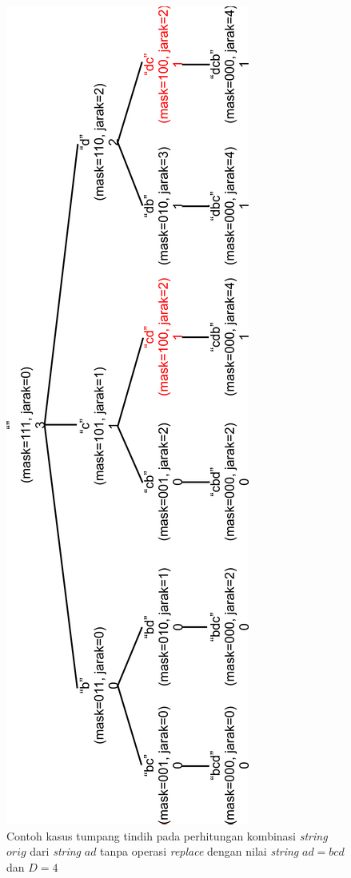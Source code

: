 \begin{figure}
	\centerline{ \includegraphics[scale=0.3]{assets/images/new/jpg/subproblem1-overlapping-rotated.jpg}}
	\caption{Contoh kasus tumpang tindih pada perhitungan kombinasi \textit{string} $ orig $ dari \textit{string} $ ad $ tanpa operasi \textit{replace} dengan nilai \textit{string} $ ad=bcd $ dan $ D=4 $}
	\label{figure:contoh_kasus_tumpang_tindih}
\end{figure}

